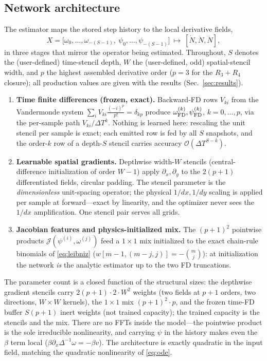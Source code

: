 \documentclass[11pt]{article}
\theoremstyle{plain}
\theoremstyle{definition}
\newcommand{\Jop}{\mathcal{J}}
\newcommand{\Ndot}{\dot{N}}
\newcommand{\Nddot}{\ddot{N}}
\newcommand{\Ndddot}{\dddot{N}}
\newcommand{\bO}{\mathcal{O}}
\newcommand{\DT}{\Delta T}
\begin{document}
\subsection{Network architecture}
\label{sec:arch}
The estimator maps the stored step history to the local derivative fields,
\begin{equation}
X=\big[\omega_0,\dots,\omega_{-(S-1)},\ \psi_0,\dots,\psi_{-(S-1)}\big]
\ \longmapsto\ [\Ndot,\Nddot,\Ndddot],
\end{equation}
in three stages that mirror the operator being estimated. Throughout, $S$
denotes the (user-defined) time-stencil depth, $W$ the (user-defined,
odd) spatial-stencil width, and $p$ the highest assembled derivative order
($p=3$ for the $R_3{+}R_4$ closure); all production values are given with
the results (Sec.~\ref{sec:results}).
\begin{enumerate}[leftmargin=1.6em,nosep,topsep=2pt]
\item \textbf{Time finite differences (frozen, exact).} Backward-FD rows
$V_{ki}$ from the Vandermonde system
$\sum_iV_{ki}\tfrac{(-i)^p}{p!}=\delta_{kp}$ produce
$\omega^{(k)}_{\rm FD},\psi^{(k)}_{\rm FD}$, $k=0,\dots,p$, via the
per-sample path $V_{ki}/\DT^k$. Nothing is learned here: rescaling the unit
stencil per sample is exact; each emitted row is fed by all $S$ snapshots,
and the order-$k$ row of a depth-$S$ stencil carries accuracy
$\bO(\DT^{S-k})$.
\item \textbf{Learnable spatial gradients.} Depthwise width-$W$ stencils
(central-difference initialization of order $W{-}1$) apply
$\partial_x,\partial_y$
to the $2(p{+}1)$ differentiated fields, circular padding. The stencil
parameter is the
\emph{dimensionless} unit-spacing operator; the physical $1/dx,1/dy$ scaling
is applied per sample at forward---exact by linearity, and the optimizer never
sees the $1/dx$ amplification. One stencil pair serves all grids.
\item \textbf{Jacobian features and physics-initialized mix.} The
$(p{+}1)^2$ pointwise products
$\Jop(\psi^{(i)},\omega^{(j)})$ feed a $1\times1$ mix initialized to the exact
chain-rule binomials of \eqref{eq:leibniz} ($w[m-1,(m-j,j)]=-\binom mj$): at
initialization the network \emph{is} the analytic estimator up to the two FD
truncations.
\end{enumerate}
The parameter count is a closed function of the structural sizes: the
depthwise gradient stencils carry $2(p{+}1)\cdot2\cdot W^2$ weights (two
fields at $p{+}1$ orders, two directions, $W\times W$ kernels), the
$1\times1$ mix $(p{+}1)^2\cdot p$, and the frozen time-FD buffer
$S(p{+}1)$ inert weights (not trained capacity); the trained capacity is the
stencils and the mix. There are no FFTs inside the model---the pointwise
product is the sole irreducible nonlinearity, and carrying $\psi$ in the
history makes even the $\beta$ term local
($\beta\partial_x\Delta^{-1}\omega=-\beta v$). The architecture is exactly
quadratic in the input field, matching the quadratic nonlinearity of
\eqref{eq:ode}.
\end{document}
